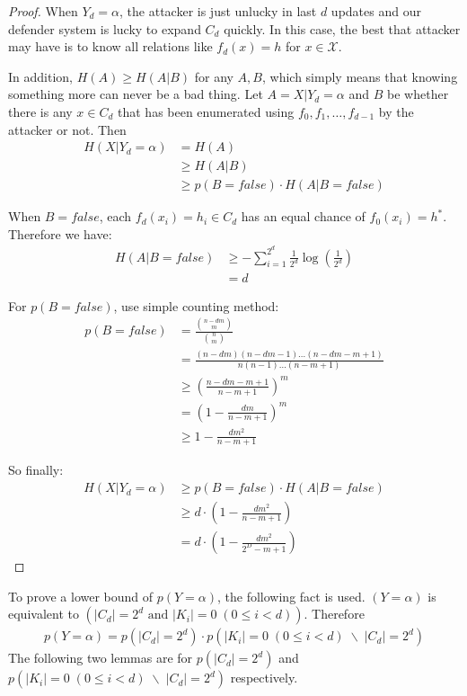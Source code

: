 \documentclass[10pt,a4paper]{article}
\begin{document}
		\begin{proof}
			When $Y_d = \alpha$, the attacker
			is just unlucky in last $d$ updates
			and our defender system is lucky
			to expand $C_d$ quickly.
			In this case, the best that attacker
			may have is to know all relations
			like $f_d(x) = h$ for $x \in \mathcal X$.
			
			In addition, $H(A) \geq H(A|B)$ for
			any $A, B$, which simply means that knowing something
			more can never be a bad thing. Let $A = X | Y_d = \alpha$
			and $B$ be whether there is any $x \in C_d$ that
			has been enumerated using $f_0, f_1, \ldots, f_{d-1}$ 
			by the attacker or not.
			Then
			\begin{align*}
				H(X | Y_d = \alpha) &= H(A)\\
					&\geq H(A | B)\\
					&\geq p(B = false) \cdot H(A | B = false)
			\end{align*}
			
			When $B = false$, each $f_d(x_i) = h_i \in C_d$
			has an equal chance of $f_0(x_i) = h^*$. Therefore
			we have:
			\begin{align*}
				H(A | B = false) &\geq -\sum_{i = 1}^{2^d} \frac{1}{2^d} \log(\frac{1}{2^d})\\
					&= d
			\end{align*}
			
			For $p(B = false)$, use simple counting method:
			\begin{align*}
				p(B = false) &= \frac{\binom{n-dm}{m}}{\binom{n}{m}}\\
					&= \frac{(n-dm)(n-dm-1)\ldots(n-dm-m+1)}{n(n-1)\ldots(n-m+1)}\\
					&\geq (\frac{n-dm-m+1}{n-m+1})^m\\
					&= (1-\frac{dm}{n-m+1})^m\\
					&\geq 1-\frac{dm^2}{n-m+1}
			\end{align*}
			
			So finally:
			\begin{align*}
				H(X | Y_d = \alpha) &\geq p(B = false) \cdot H(A | B = false)\\
					&\geq d \cdot (1-\frac{dm^2}{n-m+1})\\
					&= d \cdot (1-\frac{dm^2}{2^D-m+1})
			\end{align*}
		\end{proof}
		
		To prove a lower bound of $p(Y = \alpha)$, the following fact is used.
		$(Y = \alpha)$ is equivalent to $\left(|C_d| = 2^d \text{ and } |K_i| = 0	\; (0 \leq i < d)\right)$.
		Therefore 
		\begin{align*}
			p(Y = \alpha) = p(|C_d| = 2^d) \cdot p(|K_i| = 0	\; (0 \leq i < d) \; \backslash \; |C_d| = 2^d)
		\end{align*}
		The following two lemmas are for $p(|C_d| = 2^d)$ and $p(|K_i| = 0	\; (0 \leq i < d) \; \backslash \; |C_d| = 2^d)$ 
		respectively.
		
\end{document}

